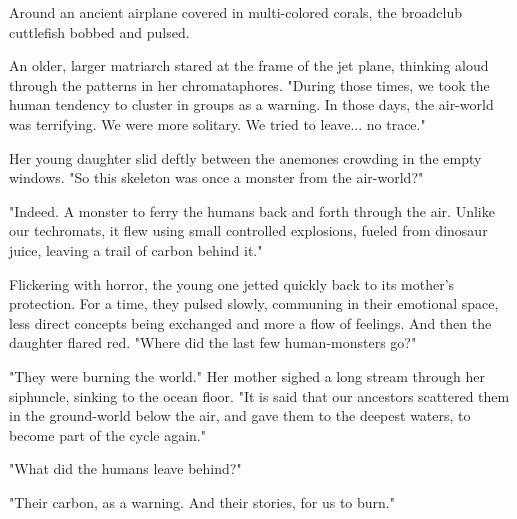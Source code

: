 
Around an ancient airplane covered in multi-colored corals, the
broadclub cuttlefish bobbed and pulsed.

An older, larger matriarch stared at the frame of the jet plane,
thinking aloud through the patterns in her chromataphores. "During those
times, we took the human tendency to cluster in groups as a warning. In
those days, the air-world was terrifying. We were more solitary. We
tried to leave... no trace."

Her young daughter slid deftly between the anemones crowding in the
empty windows. "So this skeleton was once a monster from the air-world?"

"Indeed. A monster to ferry the humans back and forth through the air.
Unlike our techromats, it flew using small controlled explosions, fueled
from dinosaur juice, leaving a trail of carbon behind it."

Flickering with horror, the young one jetted quickly back to its
mother's protection. For a time, they pulsed slowly, communing in their
emotional space, less direct concepts being exchanged and more a flow of
feelings. And then the daughter flared red. "Where did the last few
human-monsters go?"

"They were burning the world." Her mother sighed a long stream through
her siphuncle, sinking to the ocean floor. "It is said that our
ancestors scattered them in the ground-world below the air, and gave
them to the deepest waters, to become part of the cycle again."

"What did the humans leave behind?"

"Their carbon, as a warning. And their stories, for us to burn."
